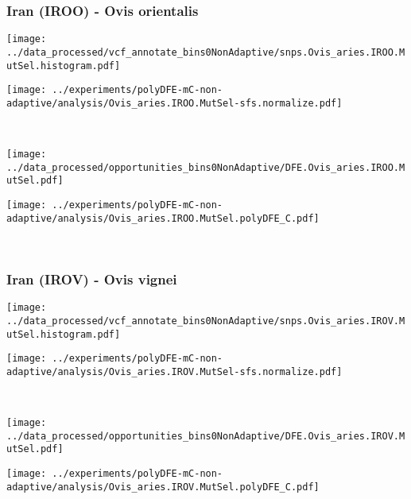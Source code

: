 \subsubsection{Iran (IROO) - Ovis orientalis}

\begin{minipage}{0.49\linewidth}
    \texttt{[image: ../data\_processed/vcf\_annotate\_bins0NonAdaptive/snps.Ovis\_aries.IROO.MutSel.histogram.pdf]}
\end{minipage}
\begin{minipage}{0.49\linewidth}
    \texttt{[image: ../experiments/polyDFE-mC-non-adaptive/analysis/Ovis\_aries.IROO.MutSel-sfs.normalize.pdf]}
\end{minipage}
\\
\begin{minipage}{0.49\linewidth}
    \texttt{[image: ../data\_processed/opportunities\_bins0NonAdaptive/DFE.Ovis\_aries.IROO.MutSel.pdf]}
\end{minipage}
\begin{minipage}{0.49\linewidth}
    \texttt{[image: ../experiments/polyDFE-mC-non-adaptive/analysis/Ovis\_aries.IROO.MutSel.polyDFE\_C.pdf]}
\end{minipage}
\\

\subsubsection{Iran (IROV) - Ovis vignei}

\begin{minipage}{0.49\linewidth}
    \texttt{[image: ../data\_processed/vcf\_annotate\_bins0NonAdaptive/snps.Ovis\_aries.IROV.MutSel.histogram.pdf]}
\end{minipage}
\begin{minipage}{0.49\linewidth}
    \texttt{[image: ../experiments/polyDFE-mC-non-adaptive/analysis/Ovis\_aries.IROV.MutSel-sfs.normalize.pdf]}
\end{minipage}
\\
\begin{minipage}{0.49\linewidth}
    \texttt{[image: ../data\_processed/opportunities\_bins0NonAdaptive/DFE.Ovis\_aries.IROV.MutSel.pdf]}
\end{minipage}
\begin{minipage}{0.49\linewidth}
    \texttt{[image: ../experiments/polyDFE-mC-non-adaptive/analysis/Ovis\_aries.IROV.MutSel.polyDFE\_C.pdf]}
\end{minipage}
\\

